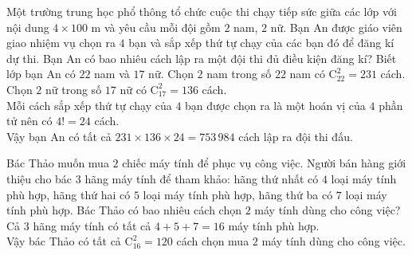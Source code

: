 \begin{bt}%
	Một trường trung học phổ thông tổ chức cuộc thi chạy tiếp sức giữa các lớp với nội dung $4 \times 100$ m và yêu cầu mỗi đội gồm $2$ nam, $2$ nữ. Bạn An được giáo viên giao nhiệm vụ chọn ra $4$ bạn và sắp xếp thứ tự chạy của các bạn đó để đăng kí dự thi. Bạn An có bao nhiêu cách lập ra một đội thi đủ điều kiện đăng kí? Biết lớp bạn An có $22$ nam và $17$ nữ.
	\loigiai
	{Chọn $2$ nam trong số $22$ nam có $\mathrm{C}_{22}^2=231$ cách.\\
		Chọn $2$ nữ trong số $17$ nữ có $\mathrm{C}_{17}^2=136$ cách.\\
		Mỗi cách sắp xếp thứ tự chạy của $4$ bạn được chọn ra là một hoán vị của $4$ phần tử nên có $4!=24$ cách.\\
		Vậy bạn An có tất cả $231\times 136\times 24=753\, 984$ cách lập ra đội thi đấu.
	}
\end{bt}

\begin{bt}%
	Bác Thảo muốn mua $2$ chiếc máy tính để phục vụ công việc. Người bán hàng giới thiệu cho bác $3$ hãng máy tính để tham khảo: hãng thứ nhất có $4$ loại máy tính phù hợp, hãng thứ hai có $5$ loại máy tính phù hợp, hãng thứ ba có $7$ loại máy tính phù hợp. Bác Thảo có bao nhiêu cách chọn $2$ máy tính dùng cho công việc?
	\loigiai
	{Cả $3$ hãng máy tính có tất cả $4+5+7=16$ máy tính phù hợp.\\
		Vậy bác Thảo có tất cả $\mathrm{C}_{16}^2=120$ cách chọn mua $2$ máy tính dùng cho công việc.
	}
\end{bt}

